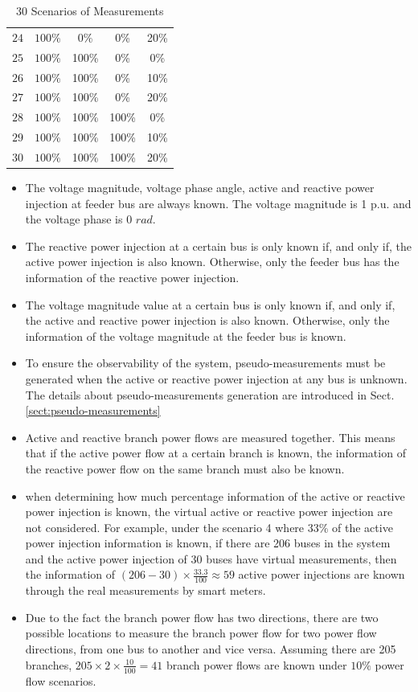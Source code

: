 \begin{table}[!h]
\begin{tabular}{c|c|c|c|c}
            $24$ & $100{\%} $ & 0{\%} & 0{\%} & 20{\%} \\ 
            $25$ & $100{\%} $ & 100{\%} & 0{\%} & 0{\%} \\
            $26$ & $100{\%} $ & 100{\%} & 0{\%} & 10{\%} \\ 
            $27$ & $100{\%} $ & 100{\%} & 0{\%} & 20{\%} \\
            $28$ & $100{\%} $ & 100{\%} & 100{\%} & 0{\%} \\
            $29$ & $100{\%} $ & 100{\%} & 100{\%} & 10{\%} \\ 
            $30$ & $100{\%} $ & 100{\%} & 100{\%} & 20{\%}             
        \end{tabular}
        \caption{30 Scenarios of Measurements}
        \label{tab:30_scenarios}
    \end{table}

\begin{itemize}
    \item The voltage magnitude, voltage phase angle, active and reactive power injection at feeder bus are always known. The voltage magnitude is 1 p.u. and the voltage phase is 0 $rad$.
    \item The reactive power injection at a certain bus is only known if, and only if, the active power injection is also known. Otherwise, only the feeder bus has the information of the reactive power injection.
    \item The voltage magnitude value at a certain bus is only known if, and only if, the active and reactive power injection is also known.  Otherwise, only the information of the voltage magnitude at the feeder bus is known. 
    \item To ensure the observability of the system, pseudo-measurements must be generated when the active or reactive power injection at any bus is unknown. The details about pseudo-measurements generation are introduced in Sect.\ref{sect:pseudo-measurements}
    \item Active and reactive branch power flows are measured together. This means that if the active power flow at a certain branch is known, the information of the reactive power flow on the same branch must also be known.
    \item when determining how much percentage information of the active or reactive power injection is known, the virtual active or reactive power injection are not considered. For example, under the scenario 4 where $33 \%$ of the active power injection information is known, if there are 206 buses in the system and the active power injection of 30 buses have virtual measurements, then the information of $(206-30)\times \frac{33.3}{100} \approx 59$ active power injections are known through the real measurements by smart meters. 
    \item Due to the fact the branch power flow has two directions, there are two possible locations to measure the branch power flow for two power flow directions, from one bus to another and vice versa. Assuming there are 205 branches, $205 \times 2 \times \frac{10}{100} = 41 $ branch power flows are known under $10 {\%}$ power flow scenarios.
\end{itemize}

